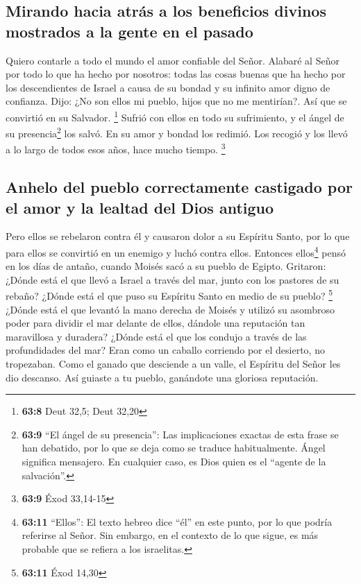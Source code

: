 \hypertarget{mirando-hacia-atruxe1s-a-los-beneficios-divinos-mostrados-a-la-gente-en-el-pasado}{%
\subsection{Mirando hacia atrás a los beneficios divinos mostrados a la
gente en el
pasado}\label{mirando-hacia-atruxe1s-a-los-beneficios-divinos-mostrados-a-la-gente-en-el-pasado}}

 Quiero contarle a todo el mundo el amor confiable del
Señor. Alabaré al Señor por todo lo que ha hecho por nosotros: todas las
cosas buenas que ha hecho por los descendientes de Israel a causa de su
bondad y su infinito amor digno de confianza.  Dijo: ¿No
son ellos mi pueblo, hijos que no me mentirían?. Así que se convirtió en
su Salvador. \footnote{\textbf{63:8} Deut 32,5; Deut 32,20}
 Sufrió con ellos en todo su sufrimiento, y el ángel de su
presencia\footnote{\textbf{63:9} ``El ángel de su presencia'': Las
  implicaciones exactas de esta frase se han debatido, por lo que se
  deja como se traduce habitualmente. Ángel significa mensajero. En
  cualquier caso, es Dios quien es el ``agente de la salvación''.} los
salvó. En su amor y bondad los redimió. Los recogió y los llevó a lo
largo de todos esos años, hace mucho tiempo. \footnote{\textbf{63:9}
  Éxod 33,14-15}

\hypertarget{anhelo-del-pueblo-correctamente-castigado-por-el-amor-y-la-lealtad-del-dios-antiguo}{%
\subsection{Anhelo del pueblo correctamente castigado por el amor y la
lealtad del Dios
antiguo}\label{anhelo-del-pueblo-correctamente-castigado-por-el-amor-y-la-lealtad-del-dios-antiguo}}

 Pero ellos se rebelaron contra él y causaron dolor a su
Espíritu Santo, por lo que para ellos se convirtió en un enemigo y luchó
contra ellos.  Entonces ellos\footnote{\textbf{63:11}
  ``Ellos'': El texto hebreo dice ``él'' en este punto, por lo que
  podría referirse al Señor. Sin embargo, en el contexto de lo que
  sigue, es más probable que se refiera a los israelitas.} pensó en los
días de antaño, cuando Moisés sacó a su pueblo de Egipto. Gritaron:
¿Dónde está el que llevó a Israel a través del mar, junto con los
pastores de su rebaño? ¿Dónde está el que puso su Espíritu Santo en
medio de su pueblo? \footnote{\textbf{63:11} Éxod 14,30} 
¿Dónde está el que levantó la mano derecha de Moisés y utilizó su
asombroso poder para dividir el mar delante de ellos, dándole una
reputación tan maravillosa y duradera?  ¿Dónde está el
que los condujo a través de las profundidades del mar? Eran como un
caballo corriendo por el desierto, no tropezaban.  Como
el ganado que desciende a un valle, el Espíritu del Señor les dio
descanso. Así guiaste a tu pueblo, ganándote una gloriosa reputación.

